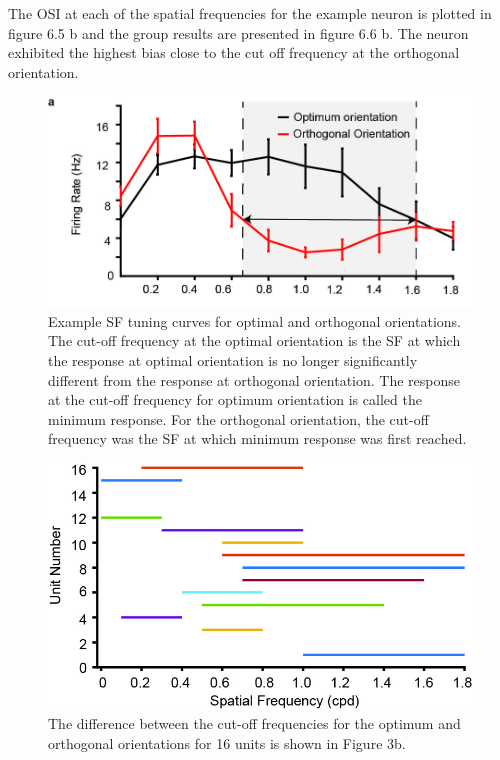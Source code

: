 	The OSI at each of the spatial frequencies for the example neuron is plotted in figure 6.5 b and the group results are presented in figure 6.6 b.
	The neuron exhibited the highest bias close to the cut off frequency at the orthogonal orientation.
	
	\begin{figure}
		\includegraphics[width=\linewidth]{superiorcolliculus/SCOptOrth.jpg}
		\caption{Example SF tuning curves for optimal and orthogonal orientations. The cut-off frequency at the
			optimal orientation is the SF at which the response at optimal orientation is no longer significantly different from the response at orthogonal
			orientation. The response at the cut-off frequency for optimum orientation is called the minimum response. For the orthogonal orientation, the
			cut-off frequency was the SF at which minimum response was first reached.}
		\label{fig:fig5}			
	\end{figure}
	
	\begin{figure}
		\includegraphics[width=\linewidth]{superiorcolliculus/SCSFTuning.jpg}
		\caption{ The difference between the cut-off frequencies for the optimum
			and orthogonal orientations for 16 units is shown in Figure 3b.}
		\label{fig:fig6}			
	\end{figure}
	
